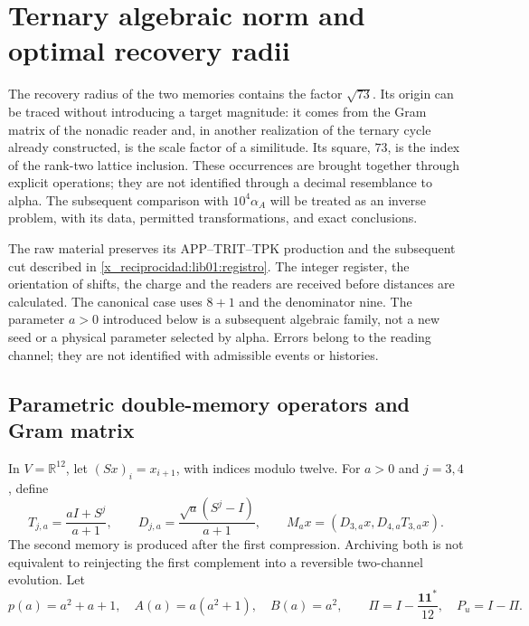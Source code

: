 \chapter{Ternary algebraic norm and optimal recovery radii}
\label{x_reciprocidad:lib02:norma-ternaria}

The recovery radius of the two memories contains the factor \(\sqrt{73}\). Its origin can be traced without introducing a target magnitude: it comes from the Gram matrix of the nonadic reader and, in another realization of the ternary cycle already constructed, is the scale factor of a similitude. Its square, \(73\), is the index of the rank-two lattice inclusion. These occurrences are brought together through explicit operations; they are not identified through a decimal resemblance to alpha. The subsequent comparison with \(10^4\alpha_A\) will be treated as an inverse problem, with its data, permitted transformations, and exact conclusions.

The raw material preserves its APP--TRIT--TPK production and the subsequent
cut described in \cref{x_reciprocidad:lib01:registro}. The integer register, the
orientation of shifts, the charge and the readers are received
before distances are calculated. The canonical case uses \(8+1\) and the
denominator nine. The parameter \(a>0\) introduced below
is a subsequent algebraic family, not a new seed or a physical
parameter selected by alpha. Errors belong to the reading channel;
they are not identified with admissible events or histories.

\section{Parametric double-memory operators and Gram matrix}
\label{x_reciprocidad:lib02:familia-memoria}

In \(V=\mathbb R^{12}\), let \((Sx)_i=x_{i+1}\), with indices modulo twelve. For \(a>0\) and \(j=3,4\), define
\begin{equation}
 T_{j,a}=\frac{aI+S^j}{a+1},\qquad
 D_{j,a}=\frac{\sqrt a(S^j-I)}{a+1},\qquad
 M_ax=(D_{3,a}x,D_{4,a}T_{3,a}x).
 \label{x_reciprocidad:lib02:lectores}
\end{equation}
The second memory is produced after the first compression. Archiving both is not equivalent to reinjecting the first complement into a reversible two-channel evolution. Let
\[
 p(a)=a^2+a+1,\quad A(a)=a(a^2+1),\quad B(a)=a^2,
 \qquad\Pi=I-\frac{\mathbf1\mathbf1^*}{12},\quad P_u=I-\Pi.
\]


